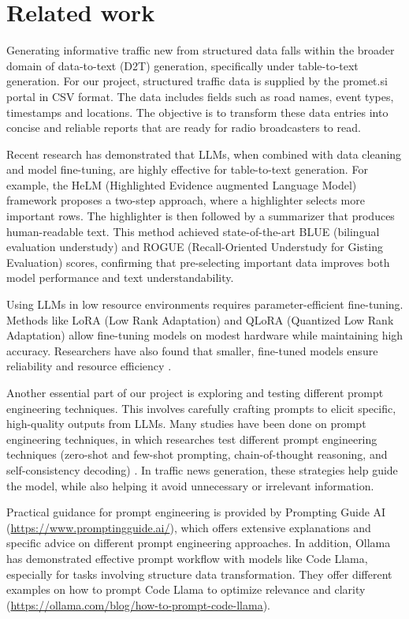 \documentclass[fleqn,moreauthors,10pt]{ds_report}
\begin{document}
\section*{Related work}
Generating informative traffic new from structured data falls within the broader domain of data-to-text (D2T) generation, specifically under table-to-text generation. For our project, structured traffic data is supplied by the promet.si portal in CSV format. The data includes fields such as road names, event types, timestamps and locations. The objective is to transform these data entries into concise and reliable reports that are ready for radio broadcasters to read.

Recent research has demonstrated that LLMs, when combined with data cleaning and model fine-tuning, are highly effective for table-to-text generation. For example, the HeLM (Highlighted Evidence augmented Language Model) framework \cite{bian2024helmhighlightedevidenceaugmented} proposes a two-step approach, where a highlighter selects more important rows. The highlighter is then followed by a summarizer that produces human-readable text. This method achieved state-of-the-art BLUE (bilingual evaluation understudy) and ROGUE (Recall-Oriented Understudy for Gisting Evaluation) scores, confirming that pre-selecting important data improves both model performance and text understandability.

Using LLMs in low resource environments requires parameter-efficient fine-tuning. Methods like LoRA (Low Rank Adaptation) \cite{lowrandadaptation} and QLoRA (Quantized Low Rank Adaptation) \cite{qlora} allow fine-tuning models on modest hardware while maintaining high accuracy. Researchers have also found that smaller, fine-tuned models ensure reliability and resource efficiency \cite{mahapatra2024impactmodelsizefinetuned}.

Another essential part of our project is exploring and testing different prompt engineering techniques. This involves carefully crafting prompts to elicit specific, high-quality outputs from LLMs. Many studies have been done on prompt engineering techniques, in which researches test different prompt engineering techniques (zero-shot and few-shot prompting, chain-of-thought reasoning, and self-consistency decoding) \cite{vatsal2024surveypromptengineeringmethods}. In traffic news generation, these strategies help guide the model, while also helping it avoid unnecessary or irrelevant information.

Practical guidance for prompt engineering is provided by Prompting Guide AI (\url{https://www.promptingguide.ai/}), which offers extensive explanations and specific advice on different prompt engineering approaches. In addition, Ollama has demonstrated effective prompt workflow with models like Code Llama, especially for tasks involving structure data transformation. They offer different examples on how to prompt Code Llama to optimize relevance and clarity (\url{https://ollama.com/blog/how-to-prompt-code-llama}).
\end{document}
